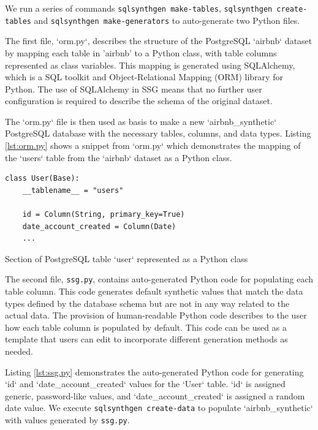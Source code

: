 \documentclass[11pt]{article}
\begin{document}
We run a series of commands \texttt{sqlsynthgen make-tables}, \texttt{sqlsynthgen create-tables} and \texttt{sqlsynthgen make-generators} to auto-generate two Python files. 

The first file, `orm.py`, describes the structure of the PostgreSQL `airbnb` dataset by mapping each table in 'airbnb' to a Python class, with table columns represented as class variables. This mapping is generated using SQLAlchemy\cite{sqlalchemy}, which is a SQL toolkit and Object-Relational Mapping (ORM) library for Python. The use of SQLAlchemy in SSG means that no further user configuration is required to describe the schema of the original dataset. 

The `orm.py` file is then used as basis to make a new `airbnb\_synthetic` PostgreSQL database with the necessary tables, columns, and data types. Listing \ref{lst:orm.py} shows a snippet from `orm.py` which demonstrates the mapping of the `users` table from the `airbnb`  dataset as a Python class.

\begin{listing}[H]
\begin{verbatim}
class User(Base):
    __tablename__ = "users"

    id = Column(String, primary_key=True)
    date_account_created = Column(Date)
    ...
\end{verbatim}
\caption{Section of PostgreSQL table `user` represented as a Python class}
\label{lst:orm.py}
\end{listing}

The second file, \texttt{ssg.py}, contains auto-generated Python code for populating each table column. This code generates default synthetic values that match the data types defined by the database schema but are not in any way related to the actual data. The provision of human-readable Python code describes to the user how each table column is populated by default. This code can be used as a template that users can edit to incorporate different generation methods as needed.

Listing \ref{lst:ssg.py} demonstrates the auto-generated Python code for generating `id` and `date\_account\_created` values for the `User` table. `id` is assigned generic, password-like values, and `date\_account\_created` is assigned a random date value. We execute \texttt{sqlsynthgen create-data} to populate `airbnb\_synthetic` with values generated by \texttt{ssg.py}.
\end{document}
